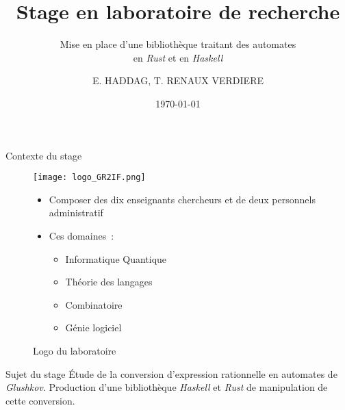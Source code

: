 \documentclass[aspectratio=169,xcolor=dvipsnames]{beamer}
\title[short title]{Stage en laboratoire de recherche}
\subtitle{
    Mise en place d'une bibliothèque traitant des automates\\ 
    en \textit{Rust} et en \textit{Haskell}
}
\author[E. HADDAG, T. RENAUX VERDIERE] {E. HADDAG, T. RENAUX VERDIERE}
\institute[Université de Rouen] 
{
    Université de Rouen Normandie \\
    UFR Sciences \& Techniques, campus du Madrillet
}
\date{\today} %
\begin{document}

\begin{frame}
    \titlepage
\end{frame}


\begin{frame}{Contexte du stage}
    \begin{figure}
        \centering
        \begin{minipage}{0.45\textwidth}
            \texttt{[image: logo\_GR2IF.png]}
            \caption{Logo du laboratoire}
            \centering
        \end{minipage}
        \hfill
        \begin{minipage}{0.45\textwidth}
            \begin{itemize}
                \item Composer des dix enseignants chercheurs et de deux personnels administratif
                \item Ces domaines~:
                    \begin{itemize}
                        \item Informatique Quantique
                        \item Théorie des langages
                        \item Combinatoire 
                        \item Génie logiciel
                    \end{itemize}
            \end{itemize}
        \end{minipage}
    \end{figure}
\end{frame}


\begin{frame}
    \begin{block}{Sujet du stage}
        Étude de la conversion d'expression rationnelle en automates de 
        \textit{Glushkov}.
        Production d'une bibliothèque \textit{Haskell} et \textit{Rust} de 
        manipulation de cette conversion.    
    \end{block}
\end{frame}

\end{document}
